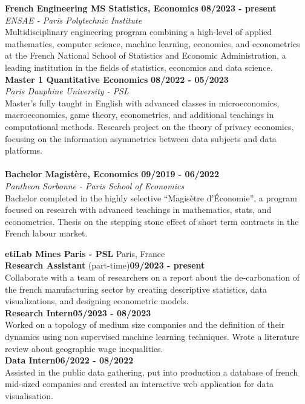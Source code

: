 \documentclass[11pt]{report}
\begin{document}
	
\noindent\textbf{French Engineering MS \textbar\space Statistics,  Economics}
\hfill
\textbf{08/2023 - present} \\
\emph{ENSAE - Paris Polytechnic Institute}\\
Multidisciplinary engineering program combining a high-level of applied mathematics, computer science, machine learning, economics, and  econometrics at the French National School of Statistics and Economic Administration, a leading institution in the fields of statistics, economics and data science.  \\

\noindent\textbf{Master 1 \textbar\space Quantitative Economics}
\hfill
\textbf{08/2022 - 05/2023} \\
\emph{Paris Dauphine University - PSL}\\
Master's fully taught in English with advanced classes in microeconomics, macroeconomics, game theory,  econometrics, and additional teachings in computational methods. Research project on the theory of privacy economics, focusing on the information asymmetries between data subjects and data platforms. \\
\\
\noindent\textbf{Bachelor \textbar\space Magistère, Economics}
\hfill
\textbf{09/2019 - 06/2022} \\
\emph{Pantheon Sorbonne - Paris School of Economics}\\
Bachelor completed in the highly selective “Magisètre d'Économie”, a program focused on research with advanced teachings in mathematics, stats, and econometrics. Thesis on the stepping stone effect
of short term contracts in the French labour market.


	\begin{flushleft}
	 \hrulefill
	\end{flushleft}


\noindent\textbf{etiLab Mines Paris - PSL} \hfill Paris, France\\[0.1cm]
\textbf{Research Assistant} (part-time)\hfill \textbf{09/2023 - present} \\
Collaborate with a team of researchers on a report about the de-carbonation of the french manufacturing sector by creating descriptive statistics, data visualizations, and designing econometric models. \\
\textbf{Research Intern}\hfill \textbf{05/2023 - 08/2023} \\
Worked on a topology of medium size companies and the definition of their dynamics using non supervised machine learning techniques. Wrote a literature review about geographic wage inequalities.  \\[0.1cm]
\textbf{Data Intern}\hfill \textbf{06/2022 - 08/2022} \\
Assisted in the public data gathering, put into production a database of french mid-sized companies and created an interactive web application for data visualisation.\\
\end{document}

